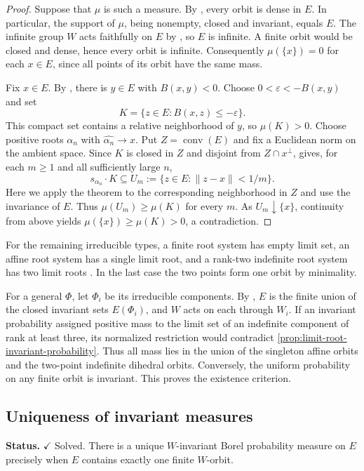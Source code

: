 \documentclass[11pt,reqno]{amsart}
\theoremstyle{plain}
\theoremstyle{definition}
\theoremstyle{remark}
\numberwithin{equation}{section}
\begin{document}
\begin{proof}
Suppose that $\mu$ is such a measure. By
\cite[Theorem~3.1(b)]{DHR}, every orbit is dense in $E$. In particular,
the support of $\mu$, being nonempty, closed and invariant, equals $E$.
The infinite group $W$ acts faithfully on $E$ by
\cite[Theorem~6.1]{DHR}, so $E$ is infinite. A finite orbit would be
closed and dense, hence every orbit is infinite. Consequently
$\mu(\{x\})=0$ for each $x\in E$, since all points of its orbit have
the same mass.

Fix $x\in E$. By \cite[Lemma~3.8(b)]{DHR}, there is $y\in E$ with
$B(x,y)<0$. Choose $0<\varepsilon<-B(x,y)$ and set
\[
K=\{z\in E:B(x,z)\le -\varepsilon\}.
\]
This compact set contains a relative neighborhood of $y$, so
$\mu(K)>0$. Choose positive roots $\alpha_n$ with
$\widehat{\alpha_n}\to x$. Put $Z=\operatorname{conv}(E)$ and fix a
Euclidean norm on the ambient space. Since $K$ is closed in $Z$ and
disjoint from $Z\cap x^\perp$, \cite[Theorem~3.11(a)]{DHR} gives,
for each $m\ge1$ and all sufficiently large $n$,
\[
s_{\alpha_n}\cdot K\subseteq U_m
   :=\{z\in E:\|z-x\|<1/m\}.
\]
Here we apply the theorem to the corresponding neighborhood in $Z$
and use the invariance of $E$. Thus $\mu(U_m)\ge\mu(K)$ for every
$m$. As $U_m\downarrow\{x\}$, continuity from above yields
$\mu(\{x\})\ge\mu(K)>0$, a contradiction.
\end{proof}

For the remaining irreducible types, a finite root system has empty
limit set, an affine root system has a single limit root, and a
rank-two indefinite root system has two limit roots
\cite[Example~2.1 and Corollary~2.15]{HLR}. In the last case the two
points form one orbit by minimality.

For a general $\Phi$, let $\Phi_i$ be its irreducible components.
By \cite[Remark~3.3]{DHR}, $E$ is the finite union of the closed
invariant sets $E(\Phi_i)$, and $W$ acts on each through $W_i$.
If an invariant probability assigned positive mass to the limit set
of an indefinite component of rank at least three, its normalized
restriction would contradict
\cref{prop:limit-root-invariant-probability}. Thus all mass lies in
the union of the singleton affine orbits and the two-point indefinite
dihedral orbits. Conversely, the uniform probability on any finite
orbit is invariant. This proves the existence criterion.

\subsection{Uniqueness of invariant measures}
\noindent\textbf{Status.} $\checkmark$ Solved. There is a unique
$W$-invariant Borel probability measure on $E$ precisely when $E$
contains exactly one finite $W$-orbit.
\end{document}
